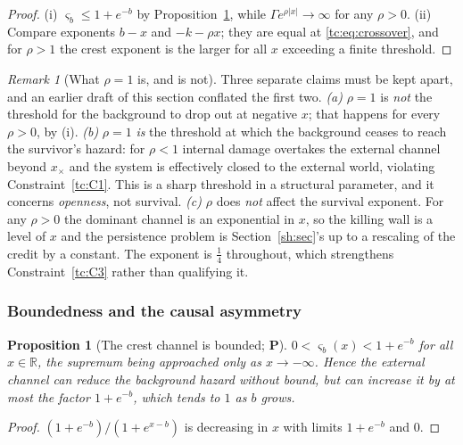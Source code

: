 \documentclass[11pt]{article}
\numberwithin{equation}{section}
\theoremstyle{plain}
\newtheorem{proposition}[theorem]{Proposition}
\theoremstyle{definition}
\theoremstyle{remark}
\newtheorem{remark}[theorem]{Remark}
\newcommand{\R}{\mathbb{R}}
\begin{document}
\begin{proof}
(i) $\varsigma_b\le1+e^{-b}$ by Proposition~\ref{tc:prop:bounded}, while
$\Gamma e^{\rho|x|}\to\infty$ for any $\rho>0$. (ii) Compare exponents
$b-x$ and $-k-\rho x$; they are equal at \eqref{tc:eq:crossover}, and
for $\rho>1$ the crest exponent is the larger for all $x$ exceeding a
finite threshold.
\end{proof}

\begin{remark}[What $\rho=1$ is, and is not]\label{tc:rem:rhorole}
Three separate claims must be kept apart, and an earlier draft of this
section conflated the first two.
\emph{(a)} $\rho=1$ is \emph{not} the threshold for the background to
drop out at negative $x$; that happens for every $\rho>0$, by
(i).
\emph{(b)} $\rho=1$ \emph{is} the threshold at which the background
ceases to reach the survivor's hazard: for $\rho<1$ internal damage
overtakes the external channel beyond $x_{\times}$ and the system is
effectively closed to the external world, violating
Constraint~\ref{tc:C1}. This is a sharp threshold in a structural
parameter, and it concerns \emph{openness}, not survival.
\emph{(c)} $\rho$ does \emph{not} affect the survival exponent. For any
$\rho>0$ the dominant channel is an exponential in $x$, so the killing
wall is a level of $x$ and the persistence problem is Section~\ref{sh:sec}'s up
to a rescaling of the credit by a constant. The exponent is $\tfrac14$
throughout, which strengthens Constraint~\ref{tc:C3} rather than
qualifying it.
\end{remark}

\subsubsection{Boundedness and the causal asymmetry}
\label{tc:subsub:asymmetry}

\begin{proposition}[The crest channel is bounded; \textbf{P}]
\label{tc:prop:bounded}
$0<\varsigma_b(x)<1+e^{-b}$ for all $x\in\R$, the supremum being
approached only as $x\to-\infty$. Hence the external channel can
\emph{reduce} the background hazard without bound, but can
\emph{increase} it by at most the factor $1+e^{-b}$, which tends to $1$
as $b$ grows.
\end{proposition}

\begin{proof}
$(1+e^{-b})/(1+e^{x-b})$ is decreasing in $x$ with limits $1+e^{-b}$ and
$0$.
\end{proof}
\end{document}
